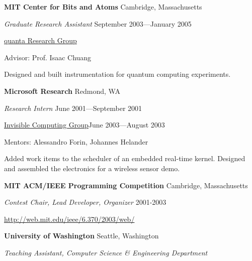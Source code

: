 \documentclass[letter]{article}
\begin{document}
\vspace{\baselineskip}
\par
{\bf MIT Center for Bits and Atoms} \hfill Cambridge, Massachusetts
\par
{\em Graduate Research Assistant} \hfill September 2003---January 2005
\par
\href{http://web.mit.edu/~cua/www/quanta/}{quanta Research Group}
\par
Advisor: Prof. Isaac Chuang
\par
Designed and built instrumentation for quantum computing experiments.
\par

\vspace{\baselineskip}
\par
{\bf Microsoft Research} \hfill Redmond, WA
\par
{\em Research Intern} \hfill June 2001---September 2001
\par
\href{http://research.microsoft.com/en-us/projects/mic/default.aspx}{Invisible Computing Group}\hfill June 2003---August 2003
\par
Mentors: Alessandro Forin, Johannes Helander
\par
Added work items to the scheduler of an embedded real-time kernel.
Designed and assembled the electronics for a wireless sensor demo.

\par

\vspace{\baselineskip}

{\bf MIT ACM/IEEE Programming Competition} \hfill Cambridge, Massachusetts

{\em Contest Chair, Lead Developer, Organizer} \hfill 2001-2003
\vspace{0.5\baselineskip}
\par

\url{http://web.mit.edu/ieee/6.370/2003/web/}

\vspace{\baselineskip}

{\bf University of Washington} \hfill Seattle, Washington

\par
{\em Teaching Assistant, Computer Science \& Engineering Department}
\end{document}
